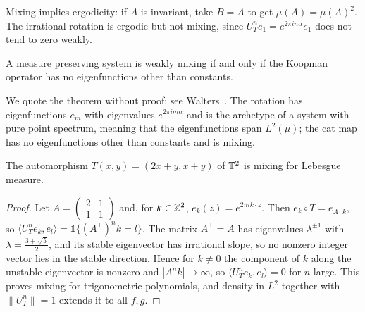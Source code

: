 Mixing implies ergodicity: if $A$ is invariant, take $B = A$ to get $\mu(A) = \mu(A)^2$. The irrational rotation is ergodic but not mixing, since $U_T^ne_1 = e^{2\pi in\alpha}e_1$ does not tend to zero weakly.

\begin{theorem}
\label{thm:koopman_vonneumann}
A measure preserving system is weakly mixing if and only if the Koopman operator has no eigenfunctions other than constants.
\end{theorem}

We quote the theorem without proof; see Walters~\cite{walters1982}. The rotation has eigenfunctions $e_m$ with eigenvalues $e^{2\pi im\alpha}$ and is the archetype of a system with pure point spectrum, meaning that the eigenfunctions span $L^2(\mu)$; the cat map has no eigenfunctions other than constants and is mixing.

\begin{theorem}
\label{thm:cat_map_mixing}
The automorphism $T(x,y) = (2x+y,x+y)$ of $\mathbb{T}^2$ is mixing for Lebesgue measure.
\end{theorem}

\begin{proof}
Let $A = \begin{pmatrix}2&1\\1&1\end{pmatrix}$ and, for $k\in\mathbb{Z}^2$, $e_k(z) = e^{2\pi ik\cdot z}$. Then $e_k\circ T = e_{A^\top k}$, so $\langle U_T^ne_k,e_l\rangle = \mathbb{1}\{(A^\top)^nk = l\}$. The matrix $A^\top = A$ has eigenvalues $\lambda^{\pm1}$ with $\lambda = \frac{3+\sqrt5}{2}$, and its stable eigenvector has irrational slope, so no nonzero integer vector lies in the stable direction. Hence for $k\neq0$ the component of $k$ along the unstable eigenvector is nonzero and $|A^nk|\to\infty$, so $\langle U_T^ne_k,e_l\rangle = 0$ for $n$ large. This proves mixing for trigonometric polynomials, and density in $L^2$ together with $\|U_T^n\| = 1$ extends it to all $f,g$.
\end{proof}


